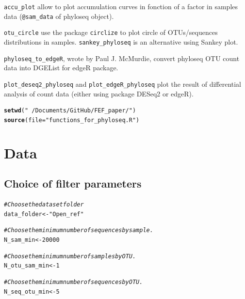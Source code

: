 \documentclass[12pt]{article}\usepackage[]{graphicx}\usepackage[]{color}
\makeatletter
\newcommand{\hlnum}[1]{\textcolor[rgb]{0.686,0.059,0.569}{#1}}%
\newcommand{\hlstr}[1]{\textcolor[rgb]{0.192,0.494,0.8}{#1}}%
\newcommand{\hlcom}[1]{\textcolor[rgb]{0.678,0.584,0.686}{\textit{#1}}}%
\newcommand{\hlstd}[1]{\textcolor[rgb]{0.345,0.345,0.345}{#1}}%
\newcommand{\hlkwb}[1]{\textcolor[rgb]{0.69,0.353,0.396}{#1}}%
\newcommand{\hlkwc}[1]{\textcolor[rgb]{0.333,0.667,0.333}{#1}}%
\newcommand{\hlkwd}[1]{\textcolor[rgb]{0.737,0.353,0.396}{\textbf{#1}}}%
\newenvironment{kframe}{%
 \def\at@end@of@kframe{}%
 \ifinner\ifhmode%
  \def\at@end@of@kframe{\end{minipage}}%
  \begin{minipage}{\columnwidth}%
 \fi\fi%
 \def\FrameCommand##1{\hskip\@totalleftmargin \hskip-\fboxsep
 \colorbox{shadecolor}{##1}\hskip-\fboxsep
     \hskip-\linewidth \hskip-\@totalleftmargin \hskip\columnwidth}%
 \MakeFramed {\advance\hsize-\width
   \@totalleftmargin\z@ \linewidth\hsize
   \@setminipage}}%
 {\par\unskip\endMakeFramed%
 \at@end@of@kframe}
\newenvironment{knitrout}{}{} %
\numberwithin{figure}{section}
\makeatother
\begin{document}
\texttt{accu\_plot} allow to plot accumulation curves in fonction of a factor in samples data (\texttt{@sam\_data} of phyloseq object).

\texttt{otu\_circle} use the package \texttt{circlize} to plot circle of OTUs/sequences distributions in samples. \texttt{sankey\_phyloseq} is an alternative using Sankey plot.

\texttt{phyloseq\_to\_edgeR}, wrote by Paul J. McMurdie, convert phyloseq OTU count data into DGEList for edgeR package.

\texttt{plot\_deseq2\_phyloseq} and \texttt{plot\_edgeR\_phyloseq} plot the result of differential analysis of count data (either using package DESeq2 or edgeR).

\begin{knitrout}\small
{}\color{fgcolor}\begin{kframe}
\begin{alltt}
\hlkwd{setwd}\hlstd{(}\hlstr{"~/Documents/GitHub/FEF_paper/"}\hlstd{)}
\hlkwd{source}\hlstd{(}\hlkwc{file} \hlstd{=} \hlstr{"functions_for_phyloseq.R"}\hlstd{)}
\end{alltt}
\end{kframe}
\end{knitrout}


\section{Data}
  
  \subsection{Choice of filter parameters}
  \label{section:filter}
\begin{knitrout}\small
{}\color{fgcolor}\begin{kframe}
\begin{alltt}
\hlcom{#Choose the dataset folder}
\hlstd{data_folder} \hlkwb{<-} \hlstr{"Open_ref"}

\hlcom{#Choose the minimum number of sequences by sample.}
\hlstd{N_sam_min} \hlkwb{<-} \hlnum{20000}

\hlcom{#Choose the minimum number of samples by OTU.}
\hlstd{N_otu_sam_min} \hlkwb{<-} \hlnum{1}

\hlcom{#Choose the minimum number of sequences by OTU.}
\hlstd{N_seq_otu_min} \hlkwb{<-} \hlnum{5}
\end{alltt}
\end{kframe}
\end{knitrout}
\end{document}
